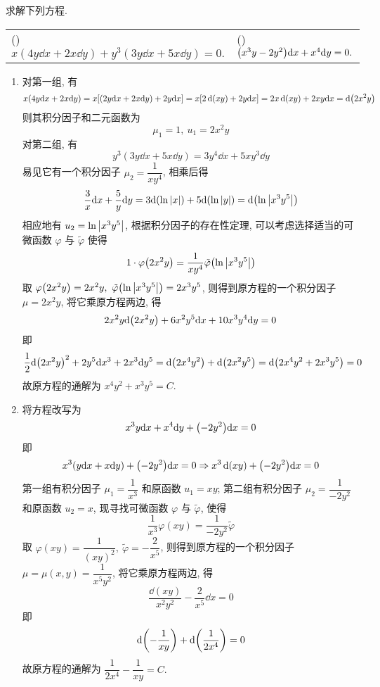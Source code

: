 \begin{example}
    求解下列方程.
    \setcounter{magicrownumbers}{0}
    \begin{table}[H]
        \centering
        \begin{tabular}{l | l}
            (\rownumber{}) $x(4y\dd x+2x\dd y)+y^3(3y\dd x+5x\dd y)=0.$ & (\rownumber{}) $\qty(x^3y-2y^2)\dd x+x^4\dd y=0.$ \\
        \end{tabular}
    \end{table}
\end{example}
\begin{solution}
    \begin{enumerate}[label=(\arabic{*})]
        \item 对第一组, 有
              $$x(4y\dd x+2x\dd y)=x\qty[(2y\dd x+2x\dd y)+2y\dd x]=x\qty[2\dd (xy)+2y\dd x]=2x\dd (xy)+2xy\dd x=\dd \qty(2x^2y)$$
              则其积分因子和二元函数为 $$\mu_1=1,~u_1=2x^2y$$
              对第二组, 有 $$y^3(3y\dd x+5x\dd y)=3y^4\dd x+5xy^3\dd y$$
              易见它有一个积分因子 $\mu_2=\dfrac{1}{xy^4}$, 相乘后得 $$\dfrac{3}{x}\dd x+\dfrac{5}{y}\dd y=3\dd \qty(\ln|x|)+5\dd \qty(\ln|y|)=\dd \qty(\ln\qty|x^3y^5|)$$
              相应地有 $u_2=\ln\qty|x^3y^5|$, 根据积分因子的存在性定理, 可以考虑选择适当的可微函数 $\varphi$ 与 $\tilde{\varphi } $ 使得
              $$1\cdot\varphi\qty(2x^2y)=\dfrac{1}{xy^4}\tilde{\varphi } \qty(\ln\qty|x^3y^5|)$$
              取 $\varphi\qty(2x^2y)=2x^2y,~\tilde{\varphi } \qty(\ln\qty|x^3y^5|)=2x^3y^5$, 则得到原方程的一个积分因子 $\mu=2x^2y$, 将它乘原方程两边, 得
              $$2x^2y\dd \qty(2x^2y)+6x^2y^5\dd x+10x^3y^4\dd y=0$$
              即 $$\dfrac{1}{2}\dd \qty(2x^2y)^2+2y^5\dd x^3+2x^3\dd y^5=\dd \qty(2x^4y^2)+\dd \qty(2x^2y^5)=\dd \qty(2x^4y^2+2x^3y^5)=0$$
              故原方程的通解为 $x^4y^2+x^3y^5=C.$
        \item 将方程改写为 $$x^3y\dd x+x^4\dd y+\qty(-2y^2)\dd x=0$$
              即 $$x^3\qty(y\dd x+x\dd y)+\qty(-2y^2)\dd x=0\Rightarrow x^3\dd (xy)+\qty(-2y^2)\dd x=0$$
              第一组有积分因子 $\mu_1=\dfrac{1}{x^3}$ 和原函数 $u_1=xy$; 第二组有积分因子 $\mu_2=\dfrac{1}{-2y^2}$ 和原函数 $u_2=x$, 现寻找可微函数 $\varphi$ 与 $\tilde{\varphi } $, 使得
              $$\dfrac{1}{x^3}\varphi(xy)=\dfrac{1}{-2y^2}\tilde{\varphi } $$
              取 $\varphi(xy)=\dfrac{1}{(xy)^2},~\tilde{\varphi } =-\dfrac{2}{x^5}$, 则得到原方程的一个积分因子 $\mu=\mu(x,y)=\dfrac{1}{x^5y^2}$, 将它乘原方程两边, 得
              $$\dfrac{\dd (xy)}{x^2y^2}-\dfrac{2}{x^5}\dd x=0$$
              即 $$\dd \qty(-\dfrac{1}{xy})+\dd \qty(\dfrac{1}{2x^4})=0$$
              故原方程的通解为 $\dfrac{1}{2x^4}-\dfrac{1}{xy}=C.$
    \end{enumerate}
\end{solution}

